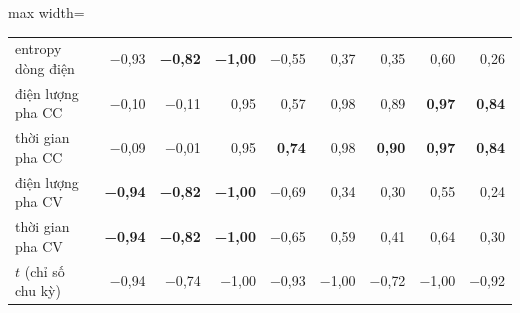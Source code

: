 \begin{table}[!htbp]
\begin{adjustbox}{max width=\textwidth}
\begin{tabular}{lrrrrrrrr}
entropy dòng điện & −0{,}93 & \textbf{−0{,}82} & \textbf{−1{,}00} & −0{,}55 & 0{,}37 & 0{,}35 & 0{,}60 & 0{,}26 \\
\addlinespace[2pt]
điện lượng pha CC & −0{,}10 & −0{,}11 & 0{,}95 & 0{,}57 & 0{,}98 & 0{,}89 & \textbf{0{,}97} & \textbf{0{,}84} \\
thời gian pha CC & −0{,}09 & −0{,}01 & 0{,}95 & \textbf{0{,}74} & 0{,}98 & \textbf{0{,}90} & \textbf{0{,}97} & \textbf{0{,}84} \\
điện lượng pha CV & \textbf{−0{,}94} & \textbf{−0{,}82} & \textbf{−1{,}00} & −0{,}69 & 0{,}34 & 0{,}30 & 0{,}55 & 0{,}24 \\
thời gian pha CV & \textbf{−0{,}94} & \textbf{−0{,}82} & \textbf{−1{,}00} & −0{,}65 & 0{,}59 & 0{,}41 & 0{,}64 & 0{,}30 \\
\addlinespace[2pt]
$t$ (chỉ số chu kỳ) & −0{,}94 & −0{,}74 & −1{,}00 & −0{,}93 & −1{,}00 & −0{,}72 & −1{,}00 & −0{,}92 \\
\bottomrule\end{tabular}\end{adjustbox}\end{table}
